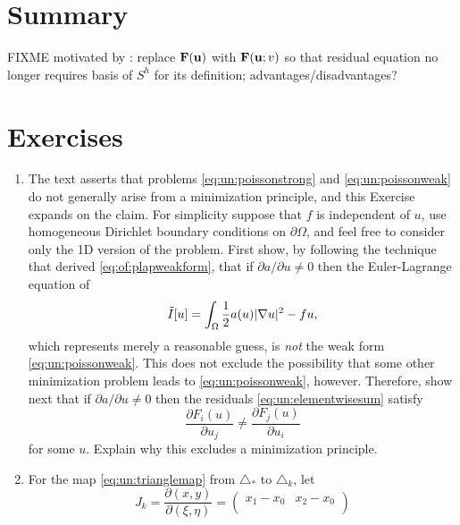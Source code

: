 \section{Summary}

FIXME motivated by \citep{Loggetal2012}: replace $\mathbf{F}(\mathbf{u})$ with $\mathbf{F}(\mathbf{u};v)$ so that residual equation no longer requires basis of $S^h$ for its definition; advantages/disadvantages?


\section{Exercises}

\renewcommand{\labelenumi}{\arabic{chapter}.\arabic{enumi}\quad}
\renewcommand{\labelenumii}{(\alph{enumii})}
\begin{enumerate}
\item \label{exer:un:notminimization}  The text asserts that problems \eqref{eq:un:poissonstrong} and \eqref{eq:un:poissonweak} do not generally arise from a minimization principle, and this Exercise expands on the claim.  For simplicity suppose that $f$ is independent of $u$, use homogeneous Dirichlet boundary conditions on $\partial \Omega$, and feel free to consider only the 1D version of the problem.  First show, by following the technique that derived \eqref{eq:of:plapweakform}, that if $\partial a/\partial u \ne 0$ then the Euler-Lagrange equation of
\begin{equation}
  \tilde I[u] = \int_\Omega \frac{1}{2} a(u) |\nabla u|^2 - f u,  \label{eq:un:nottheobjective}
\end{equation}
which represents merely a reasonable guess, is \emph{not} the weak form \eqref{eq:un:poissonweak}.  This does not exclude the possibility that some other minimization problem leads to \eqref{eq:un:poissonweak}, however.  Therefore, show next that if $\partial a/\partial u \ne 0$ then the residuals \eqref{eq:un:elementwisesum} satisfy
\begin{equation}
  \frac{\partial F_i(u)}{\partial u_j} \ne \frac{\partial F_j(u)}{\partial u_i} \label{eq:un:symmetryresidualsdonthave}
\end{equation}
for some $u$.  Explain why this excludes a minimization principle.
\item  \label{exer:un:gradientdetails}  For the map \eqref{eq:un:trianglemap} from $\triangle_\ast$ to $\triangle_k$, let
    $$J_k = \frac{\partial (x,y)}{\partial (\xi,\eta)} = \begin{pmatrix}
    x_1 - x_0 & x_2 - x_0 \\

\end{pmatrix}$$
\end{enumerate}
